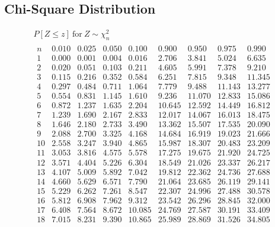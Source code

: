 \documentclass[svgnames, a5paper]{article}
\theoremstyle{definition}
\theoremstyle{remark}
\begin{document}
\begin{appendices}
\section{Chi-Square Distribution}
\begin{gather*}
P[Z \le z]~\text{for}~Z \sim \chi_n^2 \\
\begin{array}{|r|llllllll|}
\hline
n  & 0.010  & 0.025  & 0.050  & 0.100  & 0.900  & 0.950  & 0.975  & 0.990  \\
\hline
1  & 0.000  & 0.001  & 0.004  & 0.016  & 2.706  & 3.841  & 5.024  & 6.635  \\
2  & 0.020  & 0.051  & 0.103  & 0.211  & 4.605  & 5.991  & 7.378  & 9.210  \\
3  & 0.115  & 0.216  & 0.352  & 0.584  & 6.251  & 7.815  & 9.348  & 11.345 \\
4  & 0.297  & 0.484  & 0.711  & 1.064  & 7.779  & 9.488  & 11.143 & 13.277 \\
5  & 0.554  & 0.831  & 1.145  & 1.610  & 9.236  & 11.070 & 12.833 & 15.086 \\
6  & 0.872  & 1.237  & 1.635  & 2.204  & 10.645 & 12.592 & 14.449 & 16.812 \\
7  & 1.239  & 1.690  & 2.167  & 2.833  & 12.017 & 14.067 & 16.013 & 18.475 \\
8  & 1.646  & 2.180  & 2.733  & 3.490  & 13.362 & 15.507 & 17.535 & 20.090 \\
9  & 2.088  & 2.700  & 3.325  & 4.168  & 14.684 & 16.919 & 19.023 & 21.666 \\
10 & 2.558  & 3.247  & 3.940  & 4.865  & 15.987 & 18.307 & 20.483 & 23.209 \\
11 & 3.053  & 3.816  & 4.575  & 5.578  & 17.275 & 19.675 & 21.920 & 24.725 \\
12 & 3.571  & 4.404  & 5.226  & 6.304  & 18.549 & 21.026 & 23.337 & 26.217 \\
13 & 4.107  & 5.009  & 5.892  & 7.042  & 19.812 & 22.362 & 24.736 & 27.688 \\
14 & 4.660  & 5.629  & 6.571  & 7.790  & 21.064 & 23.685 & 26.119 & 29.141 \\
15 & 5.229  & 6.262  & 7.261  & 8.547  & 22.307 & 24.996 & 27.488 & 30.578 \\
16 & 5.812  & 6.908  & 7.962  & 9.312  & 23.542 & 26.296 & 28.845 & 32.000 \\
17 & 6.408  & 7.564  & 8.672  & 10.085 & 24.769 & 27.587 & 30.191 & 33.409 \\
18 & 7.015  & 8.231  & 9.390  & 10.865 & 25.989 & 28.869 & 31.526 & 34.805 \\

\end{array}
\end{gather*}
\end{appendices}
\end{document}

